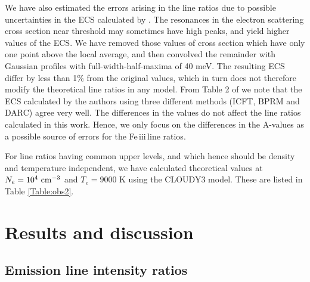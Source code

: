 \documentclass{emulateapj}
\def\unit #1{\,{\rm #1}}
\newcommand\cmcubei{\rm \,\unit{cm^{-3}}}
\newcommand\fe{Fe\,{\sc iii}\,}
\begin{document}
 We have also estimated the errors arising in the line ratios due to 
 possible uncertainties in the ECS calculated by \citet{2014ApJ...785...99B}. The resonances in the electron scattering cross section near threshold may sometimes have high peaks, and yield higher values of the ECS. 
 We have removed those values of cross section which have only one point above the local average, and then convolved the 
 remainder with Gaussian profiles with full-width-half-maxima of 40 meV. The resulting ECS differ by less than
 1\% from the original values, which in turn does not therefore modify the theoretical line ratios in any model. {From Table 2 of \citet{2014ApJ...785...99B} we note that the ECS calculated by the authors using three different methods (ICFT, BPRM and DARC) agree very well. The differences in the values do not affect the line ratios calculated in this work.} Hence, we 
 only focus on the differences in the A-values as a possible source of errors for the \fe line ratios.  


For line ratios having common upper levels, and which hence should be density and temperature independent, we have calculated  theoretical values at $N_e=10^4 \cmcubei$ and $T_e=9000$ K using the CLOUDY3 model. These are listed in Table \ref{Table:obs2}.





\section{Results and discussion}\label{section:results}

\subsection{Emission line intensity ratios}
\end{document}
